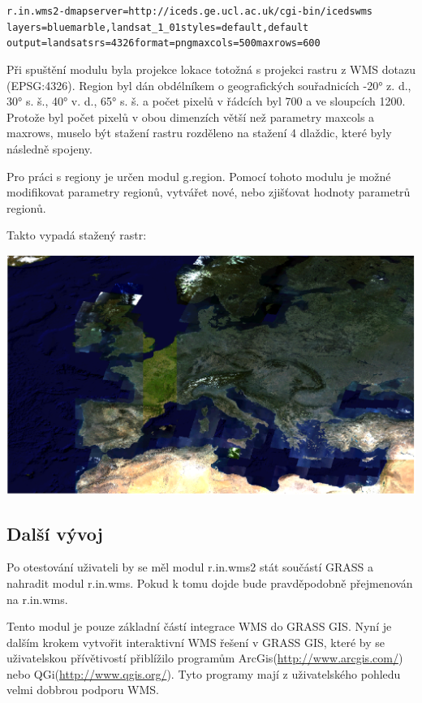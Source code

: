 \documentclass[a4paper,12pt]{article}
\begin{document}
\begin{alltt}\footnotesize
r.in.wms2 -d mapserver=http://iceds.ge.ucl.ac.uk/cgi-bin/icedswms \\ layers=bluemarble,landsat\_1\_01 styles=default,default
output=landsat srs=4326 format=png maxcols=500 maxrows=600
\end{alltt}

Při spuštění modulu byla projekce lokace totožná s projekci rastru z WMS dotazu (EPSG:4326). Region byl dán obdélníkem o geografických souřadnicích -20° z. d., 30° s. š., 40° v. d., 65° s. š. a počet pixelů v řádcích byl 700 a  ve sloupcích 1200. Protože byl počet pixelů v obou dimenzích větší než parametry maxcols a maxrows, muselo být stažení rastru rozděleno na stažení 4 dlaždic, které byly následně spojeny.

Pro práci s regiony je určen modul g.region. Pomocí tohoto modulu je možné modifikovat parametry regionů, vytvářet nové, nebo zjišťovat hodnoty parametrů regionů.

Takto vypadá stažený rastr:

\includegraphics[scale=0.28]{figures/GRASS_WMS_obrazek.png}


\subsection{Další vývoj}

Po otestování uživateli by se měl modul r.in.wms2 stát součástí GRASS a nahradit modul r.in.wms. Pokud k tomu dojde bude pravděpodobně přejmenován na r.in.wms. 

Tento modul je pouze základní částí integrace WMS do GRASS GIS. Nyní je dalším krokem vytvořit interaktivní WMS řešení v GRASS GIS, které by se uživatelskou přívětivostí přiblížilo programům  ArcGis(\url{http://www.arcgis.com/}) nebo QGi(\url{http://www.qgis.org/}). Tyto programy mají z uživatelského pohledu velmi dobbrou podporu WMS. 
\end{document}
